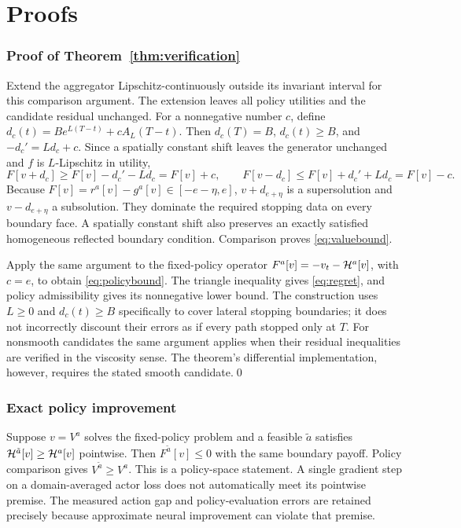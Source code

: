 \section{Proofs}\label{app:proofs}
\subsubsection{Proof of Theorem~\ref{thm:verification}}
Extend the aggregator Lipschitz-continuously outside its invariant interval for this comparison argument. The extension leaves all policy utilities and the candidate residual unchanged. For a nonnegative number $c$, define $d_c(t)=Be^{L(T-t)}+cA_L(T-t)$. Then $d_c(T)=B$, $d_c(t)\geq B$, and $-d_c'=Ld_c+c$. Since a spatially constant shift leaves the generator unchanged and $f$ is $L$-Lipschitz in utility,
\[
 F[v+d_c]\geq F[v]-d_c'-Ld_c=F[v]+c,
 \qquad F[v-d_c]\leq F[v]+d_c'+Ld_c=F[v]-c.
\]
Because $F[v]=r^a[v]-g^a[v]\in[-e-\eta,e]$, $v+d_{e+\eta}$ is a supersolution and $v-d_{e+\eta}$ a subsolution. They dominate the required stopping data on every boundary face. A spatially constant shift also preserves an exactly satisfied homogeneous reflected boundary condition. Comparison proves \eqref{eq:valuebound}.

Apply the same argument to the fixed-policy operator $F^a[v]=-v_t-\mathcal H^a[v]$, with $c=e$, to obtain \eqref{eq:policybound}. The triangle inequality gives \eqref{eq:regret}, and policy admissibility gives its nonnegative lower bound. The construction uses $L\geq0$ and $d_c(t)\geq B$ specifically to cover lateral stopping boundaries; it does not incorrectly discount their errors as if every path stopped only at $T$. For nonsmooth candidates the same argument applies when their residual inequalities are verified in the viscosity sense. The theorem's differential implementation, however, requires the stated smooth candidate.\qed

\subsubsection{Exact policy improvement}
Suppose $v=V^a$ solves the fixed-policy problem and a feasible $\tilde a$ satisfies $\mathcal H^{\tilde a}[v]\geq\mathcal H^a[v]$ pointwise. Then $F^{\tilde a}[v]\leq0$ with the same boundary payoff. Policy comparison gives $V^{\tilde a}\geq V^a$. This is a policy-space statement. A single gradient step on a domain-averaged actor loss does not automatically meet its pointwise premise. The measured action gap and policy-evaluation errors are retained precisely because approximate neural improvement can violate that premise.

